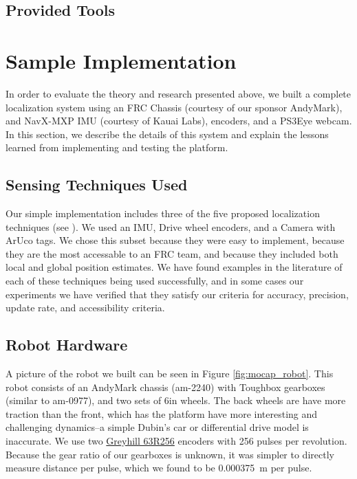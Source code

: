 \documentclass{article}
\newcommand{\Newnameref}[1]{\textit{\nameref{#1}}}
\begin{document}
  \subsection{Provided Tools} \label{section:tools}




\section{Sample Implementation} \label{section:specs}

  In order to evaluate the theory and research presented above, we built a complete localization system using an FRC Chassis (courtesy of our sponsor AndyMark), and NavX-MXP IMU (courtesy of Kauai Labs), encoders, and a PS3Eye webcam. In this section, we describe the details of this system and explain the lessons learned from implementing and testing the platform.

  \subsection{Sensing Techniques Used}\label{section:techniques_used}

    Our simple implementation includes three of the five proposed localization techniques (see \Newnameref{section:proposed_techniques}). We used an IMU, Drive wheel encoders, and a Camera with ArUco tags. We chose this subset because they were easy to implement, because they are the most accessable to an FRC team, and because they included both local and global position estimates. We have found examples in the literature of each of these techniques being used successfully, and in some cases our experiments we have verified that they satisfy our criteria for accuracy, precision, update rate, and accessibility criteria.

	\subsection{Robot Hardware}

    A picture of the robot we built can be seen in Figure \ref{fig:mocap_robot}. This robot consists of an AndyMark chassis (am-2240) with Toughbox gearboxes (similar to am-0977), and two sets of 6in wheels. The back wheels are have more traction than the front, which has the platform have more interesting and challenging dynamics--a simple Dubin's car or differential drive model is inaccurate. We use two \href{https://www.digikey.com/product-detail/en/grayhill-inc/63R256/GH3070-ND/304479}{Greyhill 63R256} encoders with 256 pulses per revolution. Because the gear ratio of our gearboxes is unknown, it was simpler to directly measure distance per pulse, which we found to be \SI{0.000375}{\meter} per pulse.
\end{document}
